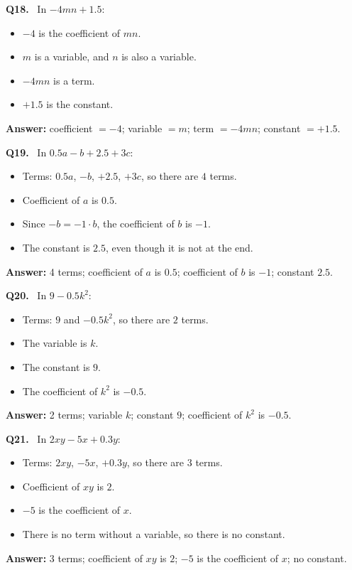 \documentclass[12pt,a4paper]{article}
\newcommand{\solQ}[1]{\textbf{#1.}\ }
\newcommand{\ans}[1]{\par\noindent\textbf{Answer: }#1\par}
\begin{document}
\begin{solbox}
\solQ{Q18} In \(-4mn+1.5\):
\begin{itemize}
  \item \(-4\) is the coefficient of \(mn\).
  \item \(m\) is a variable, and \(n\) is also a variable.
  \item \(-4mn\) is a term.
  \item \(+1.5\) is the constant.
\end{itemize}
\ans{coefficient \(=-4\); variable \(=m\); term \(=-4mn\); constant \(=+1.5\).}
\end{solbox}

\begin{solbox}
\solQ{Q19} In \(0.5a-b+2.5+3c\):
\begin{itemize}
  \item Terms: \(0.5a\), \(-b\), \(+2.5\), \(+3c\), so there are \(4\) terms.
  \item Coefficient of \(a\) is \(0.5\).
  \item Since \(-b=-1\cdot b\), the coefficient of \(b\) is \(-1\).
  \item The constant is \(2.5\), even though it is not at the end.
\end{itemize}
\ans{4 terms; coefficient of \(a\) is \(0.5\); coefficient of \(b\) is \(-1\); constant \(2.5\).}
\end{solbox}

\begin{solbox}
\solQ{Q20} In \(9-0.5k^2\):
\begin{itemize}
  \item Terms: \(9\) and \(-0.5k^2\), so there are \(2\) terms.
  \item The variable is \(k\).
  \item The constant is \(9\).
  \item The coefficient of \(k^2\) is \(-0.5\).
\end{itemize}
\ans{2 terms; variable \(k\); constant \(9\); coefficient of \(k^2\) is \(-0.5\).}
\end{solbox}

\begin{solbox}
\solQ{Q21} In \(2xy-5x+0.3y\):
\begin{itemize}
  \item Terms: \(2xy\), \(-5x\), \(+0.3y\), so there are \(3\) terms.
  \item Coefficient of \(xy\) is \(2\).
  \item \(-5\) is the coefficient of \(x\).
  \item There is no term without a variable, so there is no constant.
\end{itemize}
\ans{3 terms; coefficient of \(xy\) is \(2\); \(-5\) is the coefficient of \(x\); no constant.}
\end{solbox}
\end{document}
